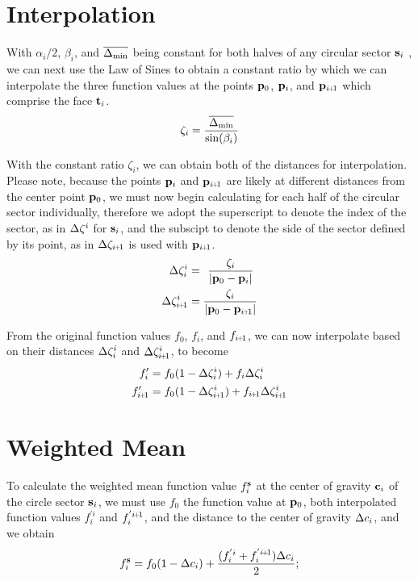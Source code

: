 \section{Interpolation}
With $\alpha_i/2$, $\beta_i$, and $\overline{\Delta_\text{min}}$ being constant for both halves of any circular sector $\mathbf{s}_i$ , we can next use the Law of Sines to obtain a constant ratio by which we can interpolate the three function values at the points $\mathbf{p}_0$, $\mathbf{p}_i$, and $\bp_{\sipo}$ which comprise the face $\mathbf{t}_i$.
\begin{equation}
	\zeta_i = \frac{\overline{\Delta_\text{min}}}{\sin(\beta_i)}
	\label{eq:zeta}
\end{equation}%
%

With the constant ratio $\zeta_i$, we can obtain both of the distances for interpolation. Please note, because the points $\mathbf{p}_i$ and $\bp_{\sipo}$ are likely at different distances from the center point $\mathbf{p}_0$, we must now begin calculating for each half of the circular sector individually, therefore we adopt the superscript to denote the index of the sector, as in $\Delta\zeta^i$ for $\mathbf{s}_i$, and the subscipt to denote the side of the sector defined by its point, as in $\Dz_{\sipo}$ is used with $\bp_{\sipo}$.
\begin{align}
	\Dz^i_i & = \kern4pt\frac{\zeta_i}{|\bp_0 - \bp_i|}
	\label{eq:distanceIForInterpolation}\\
	\Dz^i_{\sipo} & = \frac{\zeta_i}{|\bp_0 - \bp_{\sipo}|}
	\label{eq:distanceIp1ForInterpolation}
\end{align}%
%

From the original function values $f_0$, $f_i$, and $f_{\sipo}$, we can now interpolate based on their distances $\Delta\zeta^i_i$ and $\Dz^i_{\sipo}$, to become
\begin{align}
	f'_i & = f_0(1 - \Dz^i_i) + f_i\Dz^i_i \\
	f'_{\sipo} & = f_0(1 - \Dz^i_{\sipo}) + f_{\sipo}\Dz^i_{\sipo}
	\label{eq:interpolatedFs}
\end{align}%
%
%
\section{Weighted Mean}
To calculate the weighted mean function value $f^{\mathbf{s}}_i$ at the center of gravity $\mathbf{c}_i$ of the circle sector $\mathbf{s}_i$, we must use $f_0$ the function value at $\mathbf{p}_0$, both interpolated function values $f^{'i}_i$ and $f^{'\sipo}_i$, and the distance to the center of gravity $\Delta c_i$, and we obtain
\begin{equation}
	f^\bs_i = f_0(1 - \Dc_i) + \frac{(f^{'i}_i + f^{'\sipo}_i)\Dc_i}{2};
	\label{eq:weightedMeanAtCoGatSector}
\end{equation}%
%

